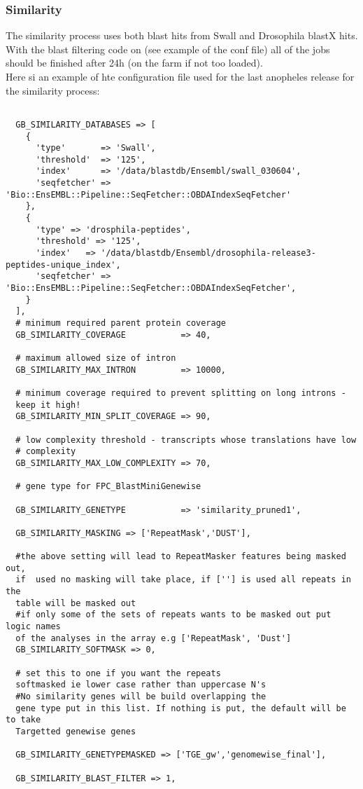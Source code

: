 \documentclass[a4paper,10pt]{article}
\begin{document}
\subsubsection{Similarity}
The similarity process uses both blast hits from Swall and Drosophila blastX hits. With the blast filtering code on (see example of the conf file) all of the jobs should be finished after 24h (on the farm if not too loaded).
\\
Here si an example of hte configuration file used for the last anopheles release for the similarity process:

\begin{verbatim}

  GB_SIMILARITY_DATABASES => [
    {				  
      'type'       => 'Swall',
      'threshold'  => '125',
      'index'      => '/data/blastdb/Ensembl/swall_030604',
      'seqfetcher' => 'Bio::EnsEMBL::Pipeline::SeqFetcher::OBDAIndexSeqFetcher'
    },
    {
      'type' => 'drosphila-peptides',
      'threshold' => '125',
      'index'   => '/data/blastdb/Ensembl/drosophila-release3-peptides-unique_index',
      'seqfetcher' => 'Bio::EnsEMBL::Pipeline::SeqFetcher::OBDAIndexSeqFetcher',
    }
  ],
  # minimum required parent protein coverage
  GB_SIMILARITY_COVERAGE           => 40,
  
  # maximum allowed size of intron 
  GB_SIMILARITY_MAX_INTRON         => 10000,
  
  # minimum coverage required to prevent splitting on long introns - 
  keep it high!
  GB_SIMILARITY_MIN_SPLIT_COVERAGE => 90,
  
  # low complexity threshold - transcripts whose translations have low
  # complexity
  GB_SIMILARITY_MAX_LOW_COMPLEXITY => 70,
  
  # gene type for FPC_BlastMiniGenewise
  
  GB_SIMILARITY_GENETYPE           => 'similarity_pruned1',
  
  GB_SIMILARITY_MASKING => ['RepeatMask','DUST'],
  
  #the above setting will lead to RepeatMasker features being masked out, 
  if  used no masking will take place, if [''] is used all repeats in the 
  table will be masked out
  #if only some of the sets of repeats wants to be masked out put logic names 
  of the analyses in the array e.g ['RepeatMask', 'Dust']
  GB_SIMILARITY_SOFTMASK => 0, 
  
  # set this to one if you want the repeats 
  softmasked ie lower case rather than uppercase N's
  #No similarity genes will be build overlapping the 
  gene type put in this list. If nothing is put, the default will be to take 
  Targetted genewise genes
  
  GB_SIMILARITY_GENETYPEMASKED => ['TGE_gw','genomewise_final'],
  
  GB_SIMILARITY_BLAST_FILTER => 1,
  
\end{verbatim}
\end{document}
